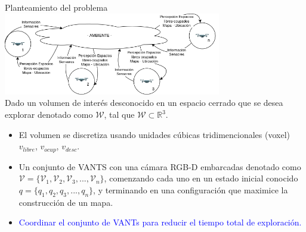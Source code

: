 \documentclass[24pt,aspectratio=169]{beamer}
\begin{document}
\begin{frame}[fragile]{Planteamiento del problema}
  \vspace{1mm}
  \centering
  \includegraphics[width=9.5cm]{problema}\\
  \justifying
  \footnotesize Dado un volumen de interés desconocido en un espacio cerrado que se desea explorar denotado como $\mathcal{W}$, tal que $\mathcal{W} \subset \mathbb{R}^{3}$.\\
  \begin{itemize}
  \item El volumen se discretiza usando unidades cúbicas tridimencionales (voxel) $v_{libre}$, $v_{ocup}$, $v_{desc}$.
  \item Un conjunto de VANTS con una cámara RGB-D embarcadas denotado como $\mathcal{V} = \{\mathcal{V}_{1},\mathcal{V}_{2},\mathcal{V}_{3},...,\mathcal{V}_{n}\}$, comenzando cada uno en un estado inicial conocido $q = \{q_{1},q_{2},q_{3},...,q_{n}\}$, y terminando en una configuración que maximice la construcción de un mapa.\\
  \item \textcolor{blue}{Coordinar el conjunto de VANTs para reducir el tiempo total de exploración.}
  \end{itemize}
      

\end{frame}
\end{document}

